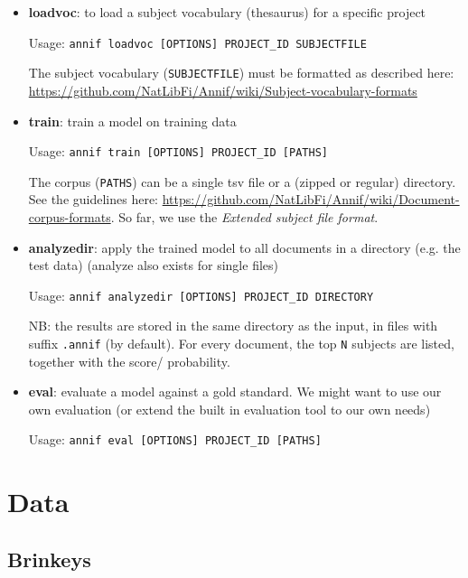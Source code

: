\documentclass{article}
\begin{document}
\begin{itemize}
    \item {\bf loadvoc}: to load a subject vocabulary (thesaurus) for a specific project
    
    Usage: \verb|annif loadvoc [OPTIONS] PROJECT_ID SUBJECTFILE|
    
    The subject vocabulary ({\tt SUBJECTFILE}) must be formatted as described here: \url{https://github.com/NatLibFi/Annif/wiki/Subject-vocabulary-formats}
    
    \item  {\bf train}: train a model on training data
    
    Usage: \verb|annif train [OPTIONS] PROJECT_ID [PATHS]|
    
    The corpus ({\tt PATHS}) can be a single tsv file or a (zipped or regular) directory. See the guidelines here:
    \url{https://github.com/NatLibFi/Annif/wiki/Document-corpus-formats}. So far, we use the \emph{Extended subject file format}.
    
    \item  {\bf analyzedir}: apply the trained model to all documents in a directory (e.g. the test data)
            (analyze also exists for single files)
            
    Usage: \verb|annif analyzedir [OPTIONS] PROJECT_ID DIRECTORY|
    
    NB: the results are stored in the same directory as the input, in files with suffix {\tt .annif} (by default). For every document, the top {\tt N} subjects are listed, together with the score/ probability.
    
    \item {\bf eval}: evaluate a model against a gold standard. We might want to use our own evaluation (or extend the built in evaluation tool to our own needs)
    
    Usage: \verb|annif eval [OPTIONS] PROJECT_ID [PATHS]|
            
\end{itemize}





\section{Data}


\subsection{Brinkeys}
\end{document}
